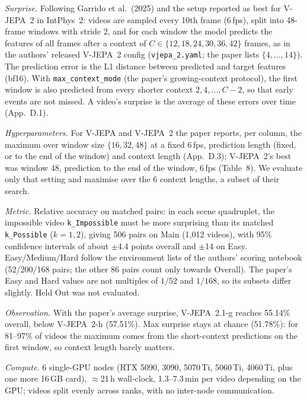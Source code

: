 \documentclass[10pt]{article}
\begin{document}
\emph{Surprise.} Following Garrido et al.\ (2025) and the setup reported as best for V-JEPA~2 in IntPhys~2:
videos are sampled every 10th frame (6\,fps), split into 48-frame windows with stride 2, and for each window the
model predicts the features of all frames after a context of $C\in\{12,18,24,30,36,42\}$ frames, as in the
authors' released V-JEPA~2 config (\texttt{vjepa\_2.yaml}; the paper lists $\{4,\dots,14\}$). The prediction error is
the L1 distance between predicted and target features (bf16). With \texttt{max\_context\_mode} (the paper's
growing-context protocol), the first window is also predicted from every shorter context $2,4,\dots,C-2$, so that
early events are not missed. A video's surprise is the average of these errors over time (App.~D.1).

\emph{Hyperparameters.} For V-JEPA and V-JEPA~2 the paper reports, per column, the maximum over window size
$\{16,32,48\}$ at a fixed 6\,fps, prediction length (fixed, or to the end of the window) and context length
(App.~D.3); V-JEPA~2's best was window 48, prediction to the end of the window, 6\,fps (Table~8). We evaluate only
that setting and maximise over the 6 context lengths, a subset of their search.

\emph{Metric.} Relative accuracy on matched pairs: in each scene quadruplet, the impossible video
\texttt{k\_Impossible} must be more surprising than its matched \texttt{k\_Possible} ($k=1,2$), giving 506 pairs
on Main (1,012 videos), with 95\% confidence intervals of about $\pm$4.4 points overall and $\pm$14 on Easy.
Easy/Medium/Hard follow the environment lists of the authors' scoring notebook (52/200/168 pairs; the other 86
pairs count only towards Overall). The paper's Easy and Hard values are not multiples of $1/52$ and $1/168$, so
its subsets differ slightly. Held Out was not evaluated.

\emph{Observation.} With the paper's average surprise, V-JEPA~2.1-g reaches 55.14\% overall, below
V-JEPA~2-h (57.51\%). Max surprise stays at chance (51.78\%): for 81--97\% of videos the maximum comes from the
short-context predictions on the first window, so context length barely matters.

\emph{Compute.} 6 single-GPU nodes (RTX 5090, 3090, 5070\,Ti, 5060\,Ti, 4060\,Ti, plus one more 16\,GB card),
$\approx$21\,h wall-clock, 1.3--7.3\,min per video depending on the GPU; videos split evenly across ranks, with no
inter-node communication.
\end{document}
